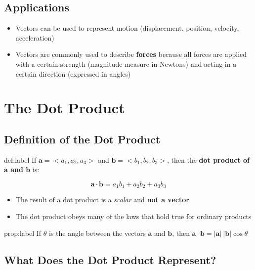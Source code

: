 \documentclass{package/notes}
\begin{document}
\subsection{Applications}

\begin{itemize}
	\item Vectors can be used to represent motion (displacement, position, velocity, acceleration)
	\item Vectors are commonly used to describe \textbf{forces} because all forces are applied with a certain strength (magnitude measure in Newtons) and acting in a certain direction (expressed in angles)
\end{itemize}



\section{The Dot Product}

\subsection{Definition of the Dot Product}

\begin{definition}{def:label}
	If $\mathbf{a} = <a_1, a_2, a_3>$ and $\mathbf{b} = <b_1, b_2, b_3>$, then the \textbf{dot product of $\mathbf{a}$ and $\mathbf{b}$} is:

	$$\mathbf a \cdot \mathbf b = a_1b_1 + a_2b_2 + a_3b_3$$
\end{definition}

\begin{itemize}
	\item The result of a dot product is a \textit{scalar} and \textbf{not a vector}
	\item The dot product obeys many of the laws that hold true for ordinary products
\end{itemize}

\begin{proposition}{prop:label}
	If $\theta$ is the angle between the vectors $\mathbf a$ and $\mathbf b$, then $ \mathbf a \cdot \mathbf b = |\mathbf a|\:|\mathbf b |\cos\theta$
\end{proposition}


\subsection{What Does the Dot Product Represent?}
\end{document}
